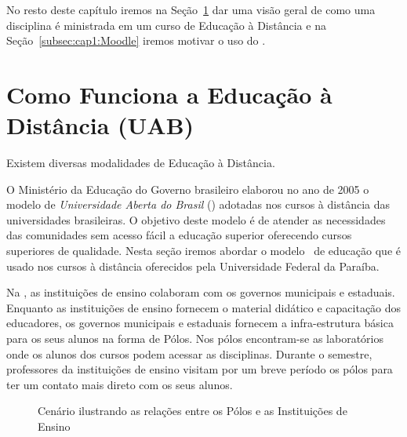 No resto deste capítulo iremos na Seção~\ref{subsec:cap1:Ead} dar uma visão geral de como uma disciplina
é ministrada em um curso de Educação à Distância e na Seção~\ref{subsec:cap1:Moodle} iremos motivar o
uso do \moodle.

\section{Como Funciona a Educação à Distância (UAB)}
\label{subsec:cap1:Ead}

Existem diversas modalidades de Educação à Distância.  

O Ministério da Educação do Governo brasileiro elaborou no ano de 2005 o modelo de 
\emph{Universidade Aberta do Brasil} (\uab) adotadas nos cursos à distância das 
universidades brasileiras. O objetivo deste modelo é de atender as necessidades 
das comunidades sem acesso fácil a educação superior oferecendo cursos superiores de qualidade.
Nesta seção iremos abordar o modelo \uab\ de educação que é usado nos cursos à distância oferecidos pela
Universidade Federal da Paraíba.

Na \uab, as instituições de ensino colaboram com os governos municipais e 
estaduais. Enquanto as instituições de ensino fornecem o material didático e capacitação 
dos educadores, os governos municipais e estaduais fornecem a infra-estrutura básica 
para os seus alunos na forma de Pólos. Nos pólos encontram-se as laboratórios onde
os alunos dos cursos podem acessar as disciplinas. Durante o semestre, professores
da instituições de ensino visitam por um breve período os pólos para ter um contato mais direto com os 
seus alunos. 
\begin{figure}[htbp]
 \begin{center}
  \caption{Cenário ilustrando as relações entre os Pólos e as Instituições de Ensino}
  \label{fig:UAB}
 \end{center}
\end{figure}

